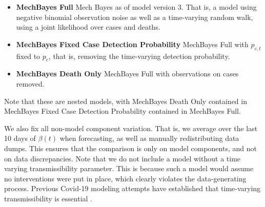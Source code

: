 \documentclass[11pt]{amsart}
\begin{document}
 \begin{itemize}
 \item \textbf{MechBayes Full} Mech Bayes as of model version 3. That is, a model using negative binomial observation noise as well as a time-varying random walk, using a joint likelihood over cases and deaths.
 
 \item \textbf{MechBayes Fixed Case Detection Probability} MechBayes Full with $p_{c,t}$ fixed to $p_c$, that is, removing the time-varying detection probability.
 
 \item \textbf{MechBayes Death Only} MechBayes Full with observations on cases removed.
 \end{itemize}
 
 Note that these are nested models, with MechBayes Death Only contained in MechBayes Fixed Case Detection Probability contained in MechBayes Full. 
 
  
 We also fix all non-model component variation. That is, we average over the last 10 days of $\beta(t)$ when forecasting, as well as manually redistributing data dumps. This ensures that the comparison is only on model components, and not on data discrepancies. Note that we do not include a model without a time varying transmissibility parameter. This is because such a model would assume no interventions were put in place, which clearly violates the data-generating process. Previous Covid-19 modeling attempts have established that time-varying transmissibility is essential \cite{pei2020differential} \cite{abbott2020estimating}\cite{flaxman2020estimating} \cite{smirnova2019forecasting}.
\end{document}

